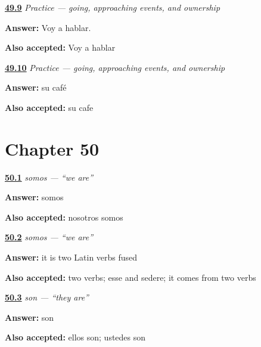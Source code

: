 \noindent\begin{minipage}[t]{\linewidth}
\raggedright
\hyperlink{review-ES-C10-practice-near-future}{\textbf{49.9}} \emph{Practice — going, approaching events, and ownership}\par
\small \textbf{Answer:} Voy a hablar.\par
\footnotesize \textbf{Also accepted:} Voy a hablar
\end{minipage}\par\medskip

\noindent\begin{minipage}[t]{\linewidth}
\raggedright
\hyperlink{review-ES-C10-practice-possessive}{\textbf{49.10}} \emph{Practice — going, approaching events, and ownership}\par
\small \textbf{Answer:} su café\par
\footnotesize \textbf{Also accepted:} su cafe
\end{minipage}\par\medskip

\section*{Chapter 50}

\noindent\begin{minipage}[t]{\linewidth}
\raggedright
\hyperlink{review-ES-C09-somos-form}{\textbf{50.1}} \emph{somos — \textquotedblleft{}we are\textquotedblright{}}\par
\small \textbf{Answer:} somos\par
\footnotesize \textbf{Also accepted:} nosotros somos
\end{minipage}\par\medskip

\noindent\begin{minipage}[t]{\linewidth}
\raggedright
\hyperlink{review-ES-C09-somos-why}{\textbf{50.2}} \emph{somos — \textquotedblleft{}we are\textquotedblright{}}\par
\small \textbf{Answer:} it is two Latin verbs fused\par
\footnotesize \textbf{Also accepted:} two verbs; esse and sedere; it comes from two verbs
\end{minipage}\par\medskip

\noindent\begin{minipage}[t]{\linewidth}
\raggedright
\hyperlink{review-ES-C09-son-form}{\textbf{50.3}} \emph{son — \textquotedblleft{}they are\textquotedblright{}}\par
\small \textbf{Answer:} son\par
\footnotesize \textbf{Also accepted:} ellos son; ustedes son
\end{minipage}\par\medskip

